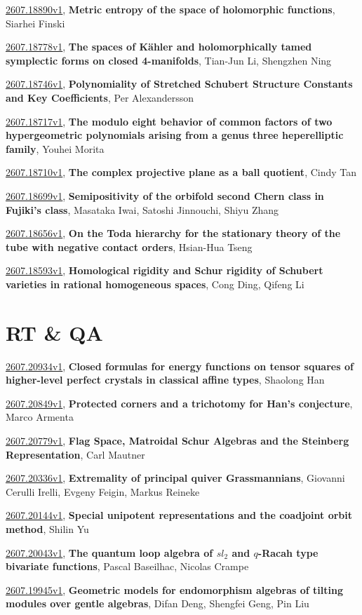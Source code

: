 \documentclass[9pt, a4paper]{article}
\theoremstyle{plain}
\theoremstyle{definition}
\theoremstyle{remark}
\newcommand{\arxiv}[3]{\href{https://arxiv.org/abs/#1}{#1}, \textbf{\textcolor{arxivblue}{#2}}, #3}
\begin{document}
\arxiv{2607.18890v1}{Metric entropy of the space of holomorphic functions}{Siarhei Finski}

\arxiv{2607.18778v1}{The spaces of Kähler and holomorphically tamed symplectic forms on closed 4-manifolds}{Tian-Jun Li, Shengzhen Ning}

\arxiv{2607.18746v1}{Polynomiality of Stretched Schubert Structure Constants and Key Coefficients}{Per Alexandersson}

\arxiv{2607.18717v1}{The modulo eight behavior of common factors of two hypergeometric polynomials arising from a genus three heperelliptic family}{Youhei Morita}

\arxiv{2607.18710v1}{The complex projective plane as a ball quotient}{Cindy Tan}

\arxiv{2607.18699v1}{Semipositivity of the orbifold second Chern class in Fujiki's class}{Masataka Iwai, Satoshi Jinnouchi, Shiyu Zhang}

\arxiv{2607.18656v1}{On the Toda hierarchy for the stationary theory of the tube with negative contact orders}{Hsian-Hua Tseng}

\arxiv{2607.18593v1}{Homological rigidity and Schur rigidity of Schubert varieties in rational homogeneous spaces}{Cong Ding, Qifeng Li}


\section{RT \& QA}
\arxiv{2607.20934v1}{Closed formulas for energy functions on tensor squares of higher-level perfect crystals in classical affine types}{Shaolong Han}

\arxiv{2607.20849v1}{Protected corners and a trichotomy for Han's conjecture}{Marco Armenta}

\arxiv{2607.20779v1}{Flag Space, Matroidal Schur Algebras and the Steinberg Representation}{Carl Mautner}

\arxiv{2607.20336v1}{Extremality of principal quiver Grassmannians}{Giovanni Cerulli Irelli, Evgeny Feigin, Markus Reineke}

\arxiv{2607.20144v1}{Special unipotent representations and the coadjoint orbit method}{Shilin Yu}

\arxiv{2607.20043v1}{The quantum loop algebra of $sl_2$ and $q$-Racah type bivariate functions}{Pascal Baseilhac, Nicolas Crampe}

\arxiv{2607.19945v1}{Geometric models for endomorphism algebras of tilting modules over gentle algebras}{Difan Deng, Shengfei Geng, Pin Liu}
\end{document}
